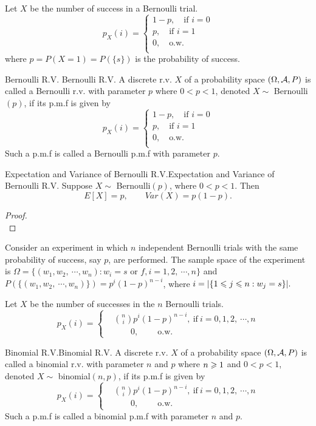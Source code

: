 \documentclass{elegantbook}
\begin{document}
Let $X$ be the number of success in a Bernoulli trial.
$$
p_X (i)=
\begin{cases}
1-p,\quad\text{if } i=0\\
p,\quad\text{if }i=1\\
0,\quad\text{o.w.}\\
\end{cases}
$$
where $p=P(X=1)=P(\{s\})$ is the probability of success.

\begin{definition}{Bernoulli R.V. }{Bernoulli R.V. }
A discrete r.v. $X$ of a probability space $(\Omega,\mathcal{A}, P)$ is called a Bernoulli r.v. with parameter $p$ where $0<p<1$, denoted $X\sim$ Bernoulli$(p)$, if its p.m.f is given by
$$
p_X (i)=
\begin{cases}
1-p,\quad\text{if } i=0\\
p,\quad\text{if }i=1\\
0,\quad\text{o.w.}\\
\end{cases}
$$
Such a p.m.f is called a Bernoulli p.m.f with parameter $p$.
\end{definition}

\begin{theorem}{Expectation and Variance of Bernoulli R.V.}{Expectation and Variance of Bernoulli R.V.}
Suppose $X\sim$ Bernoulli$(p)$, where $0<p<1$. Then $$E[X]=p,\qquad Var(X)=p(1-p).$$
\vspace{0.01cm}
\end{theorem}

\begin{proof}
\\[4cm]\vspace{0.01cm}
\end{proof}

Consider an experiment in which $n$ independent Bernoulli trials with the same probability of success, say $p$, are performed. The sample space of the experiment is $\Omega=\{(w_1,w_2,\ \cdots,w_n ): w_i=s \text{ or } f,i=1,2,\ \cdots,n\} $ and $P(\{(w_1,w_2,\ \cdots,w_n )\})=p^i (1-p)^{n-i}$, where $i=|\{1\leqslant j\leqslant n: w_j=s\}|.$

Let $X$ be the number of successes in the $n$ Bernoulli trials.
$$
p_X (i)=
\left\{\begin{aligned}
&\binom n i p^i(1-p)^{n-i},\ \text{if}\ i=0,1,2,\ \cdots,n\\
&\qquad0,\qquad\ \text{o.w.}    
\end{aligned}
\right.
$$

\begin{definition}{Binomial R.V.}{Binomial R.V.}
A discrete r.v. $X$ of a probability space $(\Omega,\mathcal{A}, P)$ is called a binomial r.v. with parameter $n$ and $p$ where $n\geqslant 1$ and $0<p<1$, denoted $X\sim$ binomial$(n,p)$, if its p.m.f is given by
$$
p_X (i)=
\left\{\begin{aligned}
&\binom n i p^i(1-p)^{n-i},\ \text{if}\ i=0,1,2,\ \cdots,n\\
&\qquad0,\qquad\ \text{o.w.}    
\end{aligned}
\right.
$$
Such a p.m.f is called a binomial p.m.f with parameter $n$ and $p$.
\end{definition}
\end{document}
